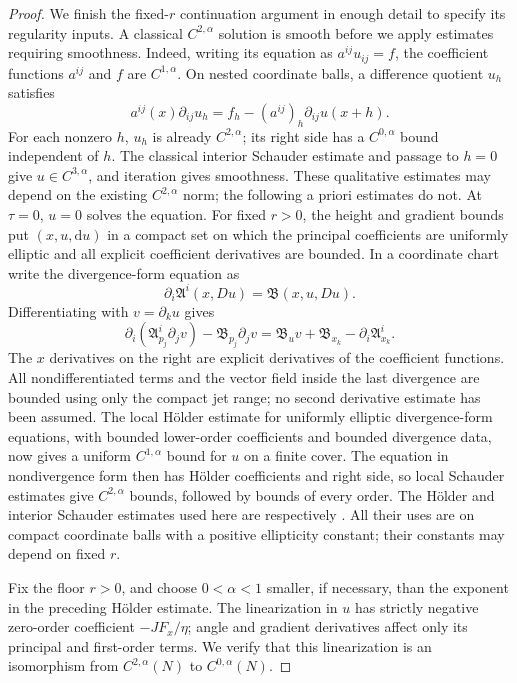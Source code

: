 \documentclass[11pt]{article}
\numberwithin{equation}{section}
\theoremstyle{definition}
\theoremstyle{remark}
\begin{document}
\begin{proof}
We finish the fixed-$r$ continuation argument in enough detail to specify
its regularity inputs. A classical $C^{2,\alpha}$ solution is smooth before
we apply estimates requiring smoothness. Indeed, writing its equation as
$a^{ij}u_{ij}=f$, the coefficient functions $a^{ij}$ and $f$ are
$C^{1,\alpha}$. On nested coordinate balls, a difference quotient $u_h$
satisfies
\[
 a^{ij}(x)\partial_{ij}u_h
 =f_h-(a^{ij})_h\partial_{ij}u(x+h).
\]
For each nonzero $h$, $u_h$ is already $C^{2,\alpha}$; its right side has
a $C^{0,\alpha}$ bound independent of $h$. The classical interior Schauder
estimate and passage to $h=0$ give $u\in C^{3,\alpha}$, and iteration gives
smoothness. These qualitative estimates may depend on the existing
$C^{2,\alpha}$ norm; the following a priori estimates do not.  At $\tau=0$, $u=0$ solves the equation.  For fixed
$r>0$, the height and gradient bounds put $(x,u,\mathrm d u)$ in a compact set
on which the principal coefficients are uniformly elliptic and all
explicit coefficient derivatives are bounded.  In a coordinate chart
write the divergence-form equation as
\[
 \partial_i\mathfrak A^i(x,Du)=\mathfrak B(x,u,Du).
\]
Differentiating with $v=\partial_ku$ gives
\begin{equation}\label{step:differentiated}
 \partial_i(\mathfrak A^i_{p_j}\partial_jv)
 -\mathfrak B_{p_j}\partial_jv
 =\mathfrak B_u v+\mathfrak B_{x_k}
   -\partial_i\mathfrak A^i_{x_k}.
\end{equation}
The $x$ derivatives on the right are explicit derivatives of the
coefficient functions.  All nondifferentiated terms and the vector field
inside the last divergence are bounded using only the compact jet range;
no second derivative estimate has been assumed.  The local Hölder
estimate for uniformly elliptic divergence-form equations, with bounded
lower-order coefficients and bounded divergence data, now gives a
uniform $C^{1,\alpha}$ bound for $u$ on a finite cover.  The equation in
nondivergence form then has Hölder coefficients and right side, so local
Schauder estimates give $C^{2,\alpha}$ bounds, followed by bounds of
every order.  The H\"older and interior Schauder estimates used here
are respectively \citet[Lecture~18, Theorem~3, and Lecture~12,
Theorem~2]{simonPDE}.
All their uses are on compact coordinate balls with a positive
ellipticity constant; their constants may depend on fixed $r$.

Fix the floor $r>0$, and choose $0<\alpha<1$ smaller, if necessary,
than the exponent in the preceding H\"older estimate.
The linearization in $u$ has strictly negative zero-order coefficient
$-JF_x/\eta$; angle and gradient derivatives affect only its principal
and first-order terms.  We verify that this linearization is an
isomorphism from $C^{2,\alpha}(N)$ to $C^{0,\alpha}(N)$.


\end{proof}
\end{document}

